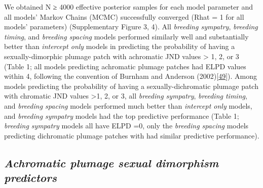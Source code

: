 \documentclass[
  a4paper,
]{article}
\begin{document}
We obtained N ≥ 4000 effective posterior samples for each model
parameter and all models' Markov Chains (MCMC) successfully converged
(Rhat = 1 for all models' parameters) (Supplementary Figure 3, 4). All
\emph{breeding sympatry}, \emph{breeding timing}, and \emph{breeding
spacing} models performed similarly well and substantially better than
\emph{intercept only} models in predicting the probability of having a
sexually-dimorphic plumage patch with achromatic JND values
\textgreater{} 1, 2, or 3 (Table 1; all models predicting achromatic
plumage patches had ELPD values within 4, following the convention of
Burnham and Anderson
(2002){[}\protect\hyperlink{ref-burnham2002}{49}{]}). Among models
predicting the probability of having a sexually-dichromatic plumage
patch with chromatic JND values \textgreater1, 2, or 3, all
\emph{breeding sympatry}, \emph{breeding timing}, and \emph{breeding
spacing} models performed much better than \emph{intercept only} models,
and \emph{breeding sympatry} models had the top predictive performance
(Table 1; \emph{breeding sympatry} models all have ELPD =0, only the
\emph{breeding spacing} models predicting dichromatic plumage patches
with had similar predictive performance).

\hypertarget{achromatic-plumage-sexual-dimorphism-predictors}{%
\subsection{\texorpdfstring{\emph{Achromatic plumage sexual dimorphism
predictors}}{Achromatic plumage sexual dimorphism predictors}}\label{achromatic-plumage-sexual-dimorphism-predictors}}
\end{document}

